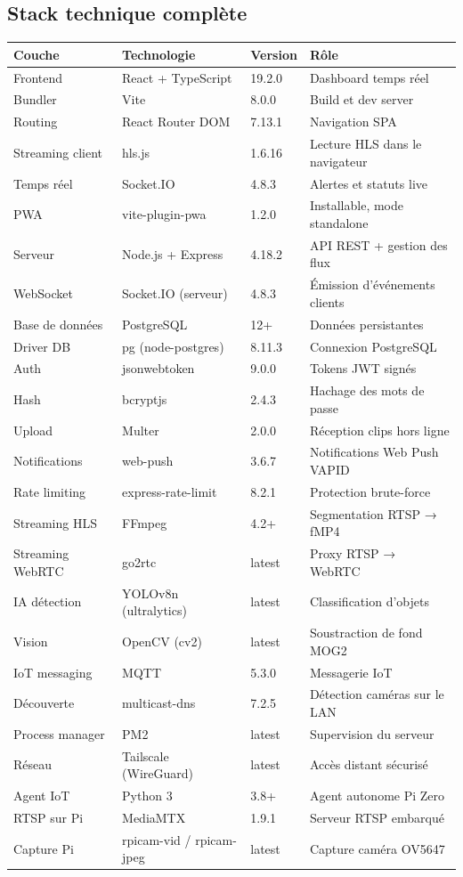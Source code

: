 \documentclass[12pt,a4paper]{article}
\begin{document}
\subsection{Stack technique complète}

\begin{longtable}{|l|l|l|p{5cm}|}
\hline
\textbf{Couche} & \textbf{Technologie} & \textbf{Version} & \textbf{Rôle} \\
\hline
\endhead
\hline
\endfoot
Frontend & React + TypeScript & 19.2.0 & Dashboard temps réel \\
Bundler & Vite & 8.0.0 & Build et dev server \\
Routing & React Router DOM & 7.13.1 & Navigation SPA \\
Streaming client & hls.js & 1.6.16 & Lecture HLS dans le navigateur \\
Temps réel & Socket.IO & 4.8.3 & Alertes et statuts live \\
PWA & vite-plugin-pwa & 1.2.0 & Installable, mode standalone \\
Serveur & Node.js + Express & 4.18.2 & API REST + gestion des flux \\
WebSocket & Socket.IO (serveur) & 4.8.3 & Émission d'événements clients \\
Base de données & PostgreSQL & 12+ & Données persistantes \\
Driver DB & pg (node-postgres) & 8.11.3 & Connexion PostgreSQL \\
Auth & jsonwebtoken & 9.0.0 & Tokens JWT signés \\
Hash & bcryptjs & 2.4.3 & Hachage des mots de passe \\
Upload & Multer & 2.0.0 & Réception clips hors ligne \\
Notifications & web-push & 3.6.7 & Notifications Web Push VAPID \\
Rate limiting & express-rate-limit & 8.2.1 & Protection brute-force \\
Streaming HLS & FFmpeg & 4.2+ & Segmentation RTSP → fMP4 \\
Streaming WebRTC & go2rtc & latest & Proxy RTSP → WebRTC \\
IA détection & YOLOv8n (ultralytics) & latest & Classification d'objets \\
Vision & OpenCV (cv2) & latest & Soustraction de fond MOG2 \\
IoT messaging & MQTT & 5.3.0 & Messagerie IoT \\
Découverte & multicast-dns & 7.2.5 & Détection caméras sur le LAN \\
Process manager & PM2 & latest & Supervision du serveur \\
Réseau & Tailscale (WireGuard) & latest & Accès distant sécurisé \\
Agent IoT & Python 3 & 3.8+ & Agent autonome Pi Zero \\
RTSP sur Pi & MediaMTX & 1.9.1 & Serveur RTSP embarqué \\
Capture Pi & rpicam-vid / rpicam-jpeg & latest & Capture caméra OV5647 \\
\hline
\end{longtable}
\end{document}
